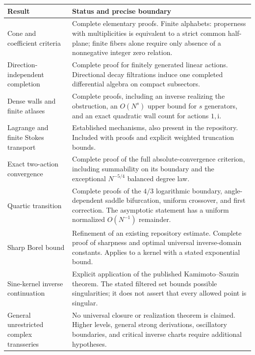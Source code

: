 \documentclass[11pt,a4paper]{article}
\numberwithin{equation}{section}
\theoremstyle{definition}
\theoremstyle{remark}
\newcommand{\ii}{\mathrm i}
\begin{document}
\begin{longtable}{@{}>{\raggedright\arraybackslash}p{}>{\raggedright\arraybackslash}p{}@{}}
\toprule
Result & Status and precise boundary \\
\midrule
\endhead
Cone and coefficient criteria & Complete elementary proofs. Finite alphabets:
properness with multiplicities is equivalent to a strict common half-plane;
finite fibers alone require only absence of a nonnegative integer zero relation.\\[4pt]
Direction-independent completion & Complete proof for finitely generated linear
actions. Directional decay filtrations induce one completed differential algebra
on compact subsectors.\\[4pt]
Dense walls and finite atlases & Complete proofs, including an inverse realizing
the obstruction, an $O(N^s)$ upper bound for $s$ generators, and an exact
quadratic wall count for actions $1,\ii$.\\[4pt]
Lagrange and finite Stokes transport & Established mechanisms, also present in
the repository. Included with proofs and explicit weighted truncation bounds.\\[4pt]
Exact two-action convergence & Complete proof of the full absolute-convergence
criterion, including summability on its boundary and the exceptional
$N^{-5/4}$ balanced degree law.\\[4pt]
Quartic transition & Complete proofs of the $4/3$ logarithmic boundary,
angle-dependent saddle bifurcation, uniform crossover, and first correction.
The asymptotic statement has a uniform normalized $O(N^{-1})$ remainder.\\[4pt]
Sharp Borel bound & Refinement of an existing repository estimate.
Complete proof of sharpness and optimal universal inverse-domain constants.
Applies to a kernel with a stated exponential bound.\\[4pt]
Sine-kernel inverse continuation & Explicit application of the published
Kamimoto--Sauzin theorem. The stated filtered set bounds possible singularities;
it does not assert that every allowed point is singular.\\[4pt]
General unrestricted complex transseries & No universal closure or realization
theorem is claimed. Higher levels, general strong derivations, oscillatory
boundaries, and critical inverse charts require additional hypotheses.\\
\bottomrule
\end{longtable}
\end{document}
